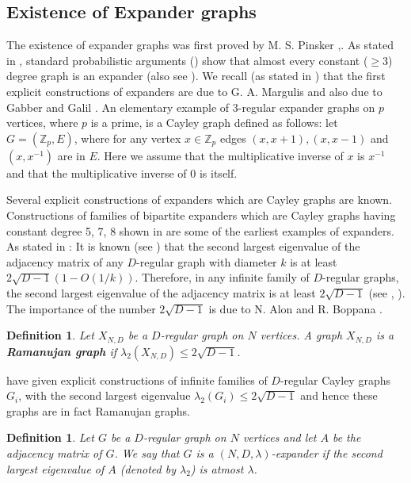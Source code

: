 \documentclass{article}
\newtheorem{definition}[theorem]{Definition}
\newcommand{\Z}{\mathbb{Z}}
\begin{document}
\subsection{Existence of Expander graphs}
The existence of expander graphs was first proved by M. S. Pinsker \cite{Pin1973},\cite[pp.152]{AS2016}. As stated in \cite[pp. 158]{RVW2002}, standard probabilistic arguments (\cite{Pin1973}) show that almost every constant ($\geq 3$) degree graph is an expander (also see \cite[Theorem 2]{ASS2008}). We recall (as stated in \cite[pp. 343]{JM1987}) that the first explicit constructions of expanders are due to G. A. Margulis and also due to Gabber and Galil \cite{GG1981}. An elementary example of $3$-regular expander graphs on $p$ vertices, where $p$ is a prime, is a Cayley graph defined as follows: let $G=(\Z_p,E)$, where for any vertex $x\in\Z_p$ edges $(x,x+1),(x,x-1)$ and $(x,x^{-1})$ are in $E$. Here we assume that the multiplicative inverse of $x$ is $x^{-1}$ and that the multiplicative inverse of $0$ is itself.

Several explicit constructions of expanders which are Cayley graphs are known. Constructions of families of bipartite expanders which are Cayley graphs having constant degree 5, 7, 8 shown in \cite{GG1981, JM1987} are some of the earliest examples of expanders. As stated in \cite[pp.153]{AS2016}: It is known (see \cite{Nil1991}) that the second largest eigenvalue of the adjacency matrix of any $D$-regular graph with diameter $k$ is at least $2\sqrt{D-1}(1-O(1/k))$. Therefore, in any infinite family of $D$-regular graphs, the second largest eigenvalue of the adjacency matrix is at least $2\sqrt{D-1}$ (see \cite[Chapter 3]{KS2011}, \cite[Proposition 4.2]{LPS1988}). The importance of the number $2\sqrt{D-1}$ is due to N. Alon and R. Boppana \cite[pp. 95]{Alo1986}.
\begin{definition}{\rm \cite[Definition 1.1]{LPS1988}}
Let $X_{N,D}$ be a $D$-regular graph on $N$ vertices. A graph $X_{N,D}$ is a {\bf Ramanujan graph} if $\lambda_2(X_{N,D})\leq 2\sqrt{D-1}$.
\end{definition}
\cite[pp.262]{LPS1988} have given explicit constructions of infinite families of $D$-regular Cayley graphs $G_i$, with the second largest eigenvalue $\lambda_2(G_i)\leq 2\sqrt{D-1}$ and hence these graphs are in fact Ramanujan graphs.%
\begin{definition}
Let $G$ be a $D$-regular graph on $N$ vertices and let $A$ be the adjacency matrix of $G$. We say that $G$ is a $(N,D,\lambda )$-expander if the second largest eigenvalue of $A$ {\rm (}denoted by $\lambda _2${\rm )} is atmost $\lambda$.
\end{definition}
\end{document}
